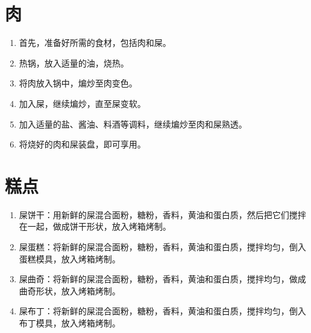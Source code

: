 \documentclass[titlepage,oneside]{ctexbook}
\begin{document}
\chapter{肉}
\begin{enumerate}
    \item 首先，准备好所需的食材，包括肉和屎。
    \item 热锅，放入适量的油，烧热。
    \item 将肉放入锅中，煸炒至肉变色。
    \item 加入屎，继续煸炒，直至屎变软。
    \item 加入适量的盐、酱油、料酒等调料，继续煸炒至肉和屎熟透。
    \item 将烧好的肉和屎装盘，即可享用。
\end{enumerate}

\chapter{糕点}
\begin{enumerate}
    \item 屎饼干：用新鲜的屎混合面粉，糖粉，香料，黄油和蛋白质，然后把它们搅拌在一起，做成饼干形状，放入烤箱烤制。
    \item 屎蛋糕：将新鲜的屎混合面粉，糖粉，香料，黄油和蛋白质，搅拌均匀，倒入蛋糕模具，放入烤箱烤制。
    \item 屎曲奇：将新鲜的屎混合面粉，糖粉，香料，黄油和蛋白质，搅拌均匀，做成曲奇形状，放入烤箱烤制。
    \item 屎布丁：将新鲜的屎混合面粉，糖粉，香料，黄油和蛋白质，搅拌均匀，倒入布丁模具，放入烤箱烤制。
\end{enumerate}
\end{document}
